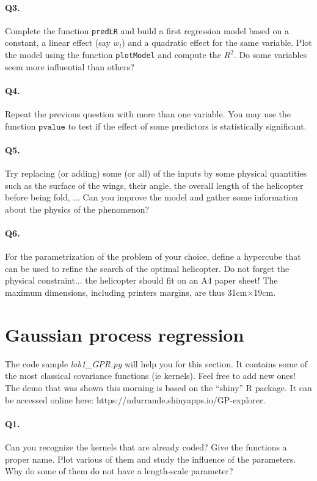 \documentclass[12pt]{scrartcl}
\begin{document}
\paragraph{Q3.} Complete the function \texttt{predLR} and build a first regression model based on a constant, a linear effect (say $w_l$) and a quadratic effect for the same variable. Plot the model using the function \texttt{plotModel} and compute the $R^2$. Do some variables seem more influential than others?

\paragraph{Q4.} Repeat the previous question with more than one variable. You may use the function $\texttt{pvalue}$ to test if the effect of some predictors is statistically significant.

\paragraph{Q5.} Try replacing (or adding) some (or all) of the inputs by some physical quantities such as the surface of the wings, their angle, the overall length of the helicopter before being fold, ... Can you improve the model and gather some information about the physics of the phenomenon?

\paragraph{Q6.} For the parametrization of the problem of your choice, define a hypercube that can be used to refine the search of the optimal helicopter. Do not forget the physical constraint... the helicopter should fit on an A4 paper sheet! The maximum dimensions, including printers margins, are thus 31cm$\times$19cm.

\section{Gaussian process regression}
The code sample \emph{lab1\_GPR.py} will help you for this section. It contains some of the most classical covariance functions (ie kernels). Feel free to add new ones! The demo that was shown this morning is based on the ``shiny'' R package. It can be accessed online here: https://ndurrande.shinyapps.io/GP-explorer.

\paragraph{Q1.} Can you recognize the kernels that are already coded? Give the functions a proper name. Plot various of them and study the influence of the parameters. Why do some of them do not have a length-scale parameter? 
\end{document}
